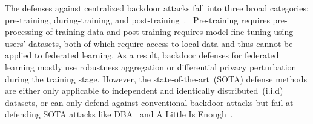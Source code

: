 The defenses against centralized backdoor attacks fall into three broad categories: pre-training, during-training, and post-training~\cite{Backdoorsurvey}.~%
%
Pre-training requires pre-processing of training data and post-training requires model fine-tuning using users' datasets, both of which require access to local data and thus cannot be applied to federated learning. As a result, backdoor defenses for federated learning mostly use robustness aggregation or differential privacy perturbation during the training stage. However, the state-of-the-art~(SOTA) defense methods are either only applicable to independent and identically distributed~(i.i.d) datasets, or can only defend against conventional backdoor attacks but fail at defending SOTA attacks like DBA~\cite{xie2020dba} and A Little Is Enough~\cite{littleisenough}. %

